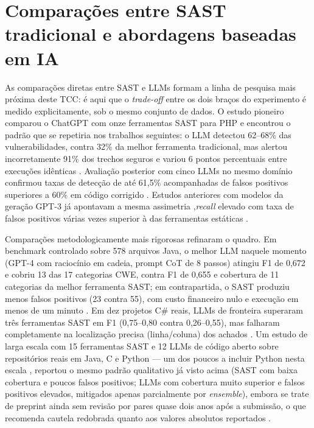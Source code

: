 \section{Comparações entre SAST tradicional e abordagens baseadas em IA}\label{sec:comparacoes-sast-ia}
As comparações diretas entre SAST e LLMs formam a linha de pesquisa mais próxima deste TCC: é aqui que o \textit{trade-off} entre os dois braços do experimento é medido explicitamente, sob o mesmo conjunto de dados. O estudo pioneiro comparou o ChatGPT com onze ferramentas SAST para PHP e encontrou o padrão que se repetiria nos trabalhos seguintes: o LLM detectou 62–68\% das vulnerabilidades, contra 32\% da melhor ferramenta tradicional, mas alertou incorretamente 91\% dos trechos seguros e variou 6 pontos percentuais entre execuções idênticas \cite{Ozturk2023AIvsSAST}. Avaliação posterior com cinco LLMs no mesmo domínio confirmou taxas de detecção de até 61,5\% acompanhadas de falsos positivos superiores a 60\% em código corrigido \cite{Cetin2024LLMPHP}. Estudos anteriores com modelos da geração GPT-3 já apontavam a mesma assimetria ,\textit{recall} elevado com taxa de falsos positivos várias vezes superior à das ferramentas estáticas \cite{Purba2023LLMVuln}.

Comparações metodologicamente mais rigorosas refinaram o quadro. Em benchmark controlado sobre 578 arquivos Java, o melhor LLM naquele momento (GPT-4 com raciocínio em cadeia, prompt CoT de 8 passos) atingiu F1 de 0,672 e cobriu 13 das 17 categorias CWE, contra F1 de 0,655 e cobertura de 11 categorias da melhor ferramenta SAST; em contrapartida, o SAST produziu menos falsos positivos (23 contra 55), com custo financeiro nulo e execução em menos de um minuto \cite{Tamberg2025LLMHarness}. Em dez projetos C\# reais, LLMs de fronteira superaram três ferramentas SAST em F1 (0,75–0,80 contra 0,26–0,55), mas falharam completamente na localização precisa (linha/coluna) dos achados \cite{Gnieciak2025LLMvsSAST}. Um estudo de larga escala com 15 ferramentas SAST e 12 LLMs de código aberto sobre repositórios reais em Java, C e Python — um dos poucos a incluir Python nesta escala , reportou o mesmo padrão qualitativo já visto acima (SAST com baixa cobertura e poucos falsos positivos; LLMs com cobertura muito superior e falsos positivos elevados, mitigados apenas parcialmente por \textit{ensemble}), embora se trate de preprint ainda sem revisão por pares quase dois anos após a submissão, o que recomenda cautela redobrada quanto aos valores absolutos reportados \cite{Zhou2024SASTLLMRepo}.

